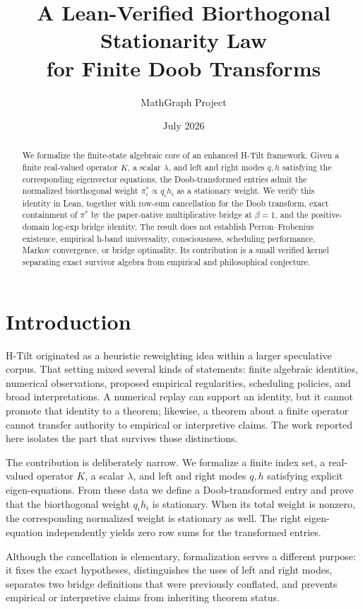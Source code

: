 \documentclass[10pt]{article}
\title{A Lean-Verified Biorthogonal Stationarity Law\\
for Finite Doob Transforms}
\author{MathGraph Project}
\date{July 2026}
\newcommand{\pistar}{\pi^{*}}
\begin{document}
\maketitle

\begin{abstract}
We formalize the finite-state algebraic core of an enhanced H-Tilt framework.
Given a finite real-valued operator \(K\), a scalar \(\lambda\), and left and right modes
\(q,h\) satisfying the corresponding eigenvector equations, the
Doob-transformed entries admit the normalized biorthogonal weight
\(\pistar_i \propto q_i h_i\) as a stationary weight. We verify this identity
in Lean, together with row-sum cancellation for the Doob transform, exact
containment of \(\pistar\) by the paper-native multiplicative bridge at
\(\beta=1\), and the positive-domain log-exp bridge identity. The result does
not establish Perron--Frobenius existence, empirical h-band universality,
consciousness, scheduling performance, Markov convergence, or bridge
optimality. Its contribution is a small verified kernel separating exact
survivor algebra from empirical and philosophical conjecture.
\end{abstract}

\section{Introduction}

H-Tilt originated as a heuristic reweighting idea within a larger speculative
corpus. That setting mixed several kinds of statements: finite algebraic
identities, numerical observations, proposed empirical regularities, scheduling
policies, and broad interpretations. A numerical replay can support an
identity, but it cannot promote that identity to a theorem; likewise, a theorem
about a finite operator cannot transfer authority to empirical or interpretive
claims. The work reported here isolates the part that survives those
distinctions.

The contribution is deliberately narrow. We formalize a finite index set, a
real-valued operator \(K\), a scalar \(\lambda\), and left and right modes
\(q,h\) satisfying explicit eigen-equations. From these data we define a
Doob-transformed entry and prove that the biorthogonal weight \(q_i h_i\) is
stationary. When its total weight is nonzero, the corresponding normalized
weight is stationary as well. The right eigen-equation independently yields
zero row sums for the transformed entries.

Although the cancellation is elementary, formalization serves a different
purpose: it fixes the exact hypotheses, distinguishes the uses of left and
right modes, separates two bridge definitions that were previously conflated,
and prevents empirical or interpretive claims from inheriting theorem status.
\end{document}
